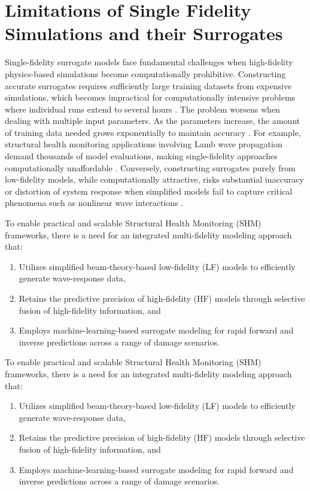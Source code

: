 \documentclass[12pt,a4paper]{report}
\begin{document}
\section{Limitations of Single Fidelity Simulations and their Surrogates}
\label{Limitations of surrogates}

Single-fidelity surrogate models face fundamental challenges when high-fidelity physics-based simulations become computationally prohibitive. Constructing accurate surrogates requires sufficiently large training datasets from expensive simulations, which becomes impractical for computationally intensive problems where individual runs extend to several hours \citep{Giselle_Fern_ndez_Godino_2023} \citep{Wang2020}. The problem worsens when dealing with multiple input parameters. As the parameters increase, the amount of training data needed grows exponentially to maintain accuracy \citep{Jakeman2020}. For example, structural health monitoring applications involving Lamb wave propagation demand thousands of model evaluations, making single-fidelity approaches computationally unaffordable \citep{https://doi.org/10.1002/eqe.4116}. Conversely, constructing surrogates purely from low-fidelity models, while computationally attractive, risks substantial inaccuracy or distortion of system response when simplified models fail to capture critical phenomena such as nonlinear wave interactions \citep{ZHANG2022101430}.

To enable practical and scalable Structural Health Monitoring (SHM) frameworks, there is a need for an integrated multi-fidelity modeling approach that:
\begin{enumerate}
    \item Utilizes simplified beam-theory-based low-fidelity (LF) models to efficiently generate wave-response data,
    \item Retains the predictive precision of high-fidelity (HF) models through selective fusion of high-fidelity information, and
    \item Employs machine-learning-based surrogate modeling for rapid forward and inverse predictions across a range of damage scenarios.
\end{enumerate}


To enable practical and scalable Structural Health Monitoring (SHM) frameworks, there is a need for an integrated multi-fidelity modeling approach that:
\begin{enumerate}
    \item Utilizes simplified beam-theory-based low-fidelity (LF) models to efficiently generate wave-response data,
    \item Retains the predictive precision of high-fidelity (HF) models through selective fusion of high-fidelity information, and
    \item Employs machine-learning-based surrogate modeling for rapid forward and inverse predictions across a range of damage scenarios.
\end{enumerate}
\end{document}
